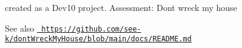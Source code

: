 created as a Dev10 project. Assessment\+: Don\textquotesingle{}t wreck my house

\begin{DoxySeeAlso}{See also}
\href{https://github.com/see-k/dontWreckMyHouse/blob/main/docs/README.md}{\texttt{ https\+://github.\+com/see-\/k/dont\+Wreck\+My\+House/blob/main/docs/\+R\+E\+A\+D\+M\+E.\+md}} 
\end{DoxySeeAlso}
